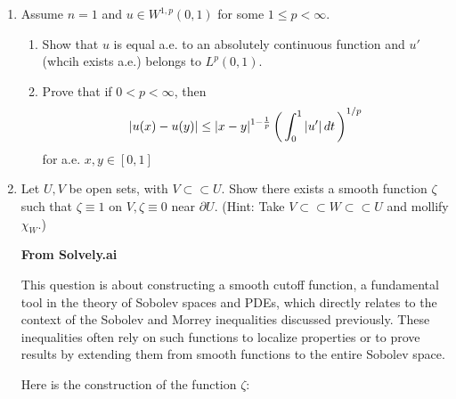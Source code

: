 \documentclass[12pt,a4paper]{report}
\newcommand{\BLUE}[1]{\textcolor{blue}{#1}}
\begin{document}
\begin{enumerate}
	\BLUE{Does there exist a $v$ that is a 1\FST weak partial of $u$?  AI says that this is a pyramid (I doubt that I would have gotten that, particularly not on a test).  This DOES have a weak derivative.
	}
	
	\item Assume $n=1$ and $u \in W^{1,p}(0,1)$ for some $1\le p< \infty$.
	\begin{enumerate}
		\item Show that $u$ is equal a.e. to an absolutely continuous function and $u'$ (whcih exists a.e.) belongs to $L^p(0,1)$.
		\item Prove that if $0< p<\infty$, then 
		\begin{align*}
			|u(x)-u(y)| \le |x-y|^{1-\frac{1}{p}} \left (\, \int_0^1 |u'|\,dt \,\right )^{1/p}
		\end{align*}for a.e. $x,y \in [0,1]$
	\end{enumerate}
	
	\item Let $U, V$ be open sets, with $V\subset\subset U$. Show there exists a smooth function $\zeta$ such that $\zeta \equiv 1$ on $V, \zeta \equiv 0$ near $\partial U$.  (Hint: Take $V \subset\subset W \subset\subset U$ and mollify $\chi_W$.)
	
	\textbf{From Solvely.ai}
	
	This question is about constructing a smooth cutoff function, a fundamental tool in the theory of Sobolev spaces and PDEs, which directly relates to the context of the Sobolev and Morrey inequalities discussed previously. These inequalities often rely on such functions to localize properties or to prove results by extending them from smooth functions to the entire Sobolev space.

Here is the construction of the function \( \zeta \):
\end{enumerate}
\end{document}
